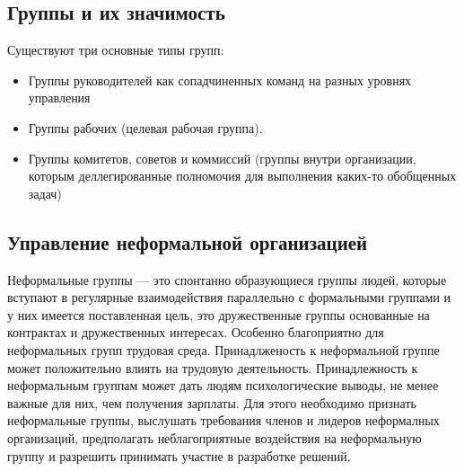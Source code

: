 \documentclass[a4paper,12pt,oneside,final]{extarticle}
\numberwithin{equation}{section}
\begin{document}
\subsection{Группы и их значимость}
Существуют три основные типы групп:
\begin{itemize}
	\item Группы руководителей как сопадчиненных команд на разных уровнях управления
	\item Группы рабочих (целевая рабочая группа).
	\item Группы комитетов, советов и коммиссий (группы внутри организации, которым деллегированные полномочия для выполнения каких-то обобщенных задач)
\end{itemize}

\subsection{Управление неформальной организацией }
Неформальные группы --- это спонтанно образующиеся группы людей, которые вступают в регулярные взаимодействия параллельно с формальными группами и у них имеется поставленная цель, это дружественные группы основанные на контрактах и дружественных интересах. 
Особенно благоприятно для неформальных групп трудовая среда. 
Принадлженость к неформальной группе может положительно влиять на трудовую деятельность. 
Принадлежность к неформальным группам может дать людям психологические выводы, не менее важные для них, чем получения зарплаты. 
Для этого необходимо признать неформальные группы, выслушать требования членов и лидеров неформалных организаций, предполагать неблагоприятные воздействия на неформальную группу и разрешить принимать участие в разработке решений. 
\end{document}
